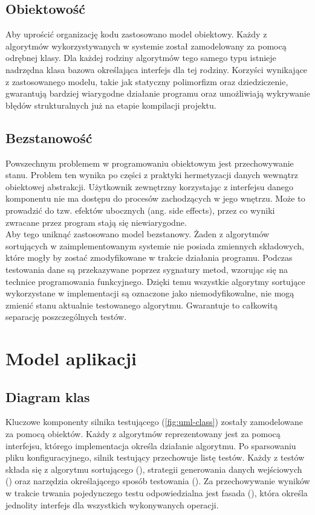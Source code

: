 \subsection{Obiektowość}
Aby uprościć organizację kodu zastosowano model obiektowy. Każdy z algorytmów wykorzystywanych w systemie
został zamodelowany za pomocą odrębnej klasy. Dla każdej rodziny algorytmów tego samego typu istnieje
nadrzędna klasa bazowa określająca interfejs dla tej rodziny. Korzyści wynikające z zastosowanego
modelu, takie jak statyczny polimorfizm oraz dziedziczenie, gwarantują bardziej wiarygodne działanie programu
oraz umożliwiają wykrywanie błędów strukturalnych już na etapie kompilacji projektu.

\subsection{Bezstanowość}
Powszechnym problemem w programowaniu obiektowym jest przechowywanie stanu. Problem ten wynika po części
z praktyki hermetyzacji danych wewnątrz obiektowej abstrakcji. Użytkownik zewnętrzny korzystając z interfejsu
danego komponentu nie ma dostępu do procesów zachodzących w jego wnętrzu. Może to prowadzić do tzw. efektów
ubocznych (ang. side effects), przez co wyniki zwracane przez program stają się niewiarygodne.\\

Aby tego uniknąć zastosowano model bezstanowy. Żaden z algorytmów sortujących w zaimplementowanym systemie
nie posiada zmiennych składowych, które mogły by zostać zmodyfikowane w trakcie działania programu. Podczas
testowania dane są przekazywane poprzez sygnatury metod, wzorując się na technice programowania funkcyjnego.
Dzięki temu wszystkie algorytmy sortujące wykorzystane w implementacji są oznaczone jako niemodyfikowalne,
nie mogą zmienić stanu aktualnie testowanego algorytmu. Gwarantuje to całkowitą separację poszczególnych testów.

\section{Model aplikacji}

\subsection{Diagram klas}
Kluczowe komponenty silnika testującego (\ref{fig:uml-class}) zostały zamodelowane za pomocą obiektów. Każdy z algorytmów reprezentowany jest za pomocą interfejsu, którego implementacja określa działanie algorytmu. Po sparsowaniu pliku konfiguracyjnego, silnik testujący przechowuje listę testów. Każdy z testów składa się z algorytmu sortującego (), strategii generowania danych wejściowych () oraz narzędzia określającego sposób testowania (). Za przechowywanie wyników w trakcie trwania pojedynczego testu odpowiedzialna jest fasada (), która określa jednolity interfejs dla wszystkich wykonywanych operacji.\\

